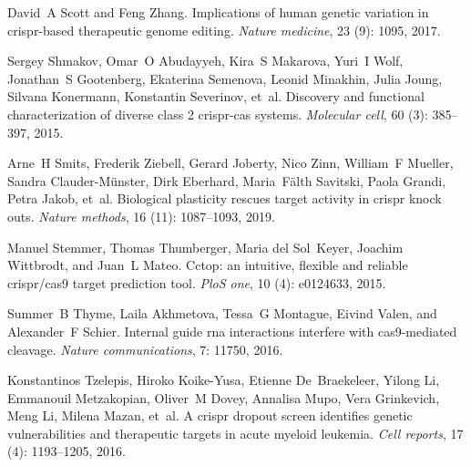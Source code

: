 \documentclass[pdftex,english,10pt]{article}
\begin{document}
{\begin{thebibliography}{105}
David~A Scott and Feng Zhang.
\newblock Implications of human genetic variation in crispr-based therapeutic
  genome editing.
\newblock \emph{Nature medicine}, 23 (9): 1095, 2017.

Sergey Shmakov, Omar~O Abudayyeh, Kira~S Makarova, Yuri~I Wolf, Jonathan~S
  Gootenberg, Ekaterina Semenova, Leonid Minakhin, Julia Joung, Silvana
  Konermann, Konstantin Severinov, et~al.
\newblock Discovery and functional characterization of diverse class 2
  crispr-cas systems.
\newblock \emph{Molecular cell}, 60 (3): 385--397, 2015.

Arne~H Smits, Frederik Ziebell, Gerard Joberty, Nico Zinn, William~F Mueller,
  Sandra Clauder-M{\"u}nster, Dirk Eberhard, Maria~F{\"a}lth Savitski, Paola
  Grandi, Petra Jakob, et~al.
\newblock Biological plasticity rescues target activity in crispr knock outs.
\newblock \emph{Nature methods}, 16 (11): 1087--1093, 2019.

Manuel Stemmer, Thomas Thumberger, Maria del Sol~Keyer, Joachim Wittbrodt, and
  Juan~L Mateo.
\newblock Cctop: an intuitive, flexible and reliable crispr/cas9 target
  prediction tool.
\newblock \emph{PloS one}, 10 (4): e0124633, 2015.

Summer~B Thyme, Laila Akhmetova, Tessa~G Montague, Eivind Valen, and
  Alexander~F Schier.
\newblock Internal guide rna interactions interfere with cas9-mediated
  cleavage.
\newblock \emph{Nature communications}, 7: 11750, 2016.

Konstantinos Tzelepis, Hiroko Koike-Yusa, Etienne De~Braekeleer, Yilong Li,
  Emmanouil Metzakopian, Oliver~M Dovey, Annalisa Mupo, Vera Grinkevich, Meng
  Li, Milena Mazan, et~al.
\newblock A crispr dropout screen identifies genetic vulnerabilities and
  therapeutic targets in acute myeloid leukemia.
\newblock \emph{Cell reports}, 17 (4): 1193--1205, 2016.


\end{thebibliography}}
\end{document}

